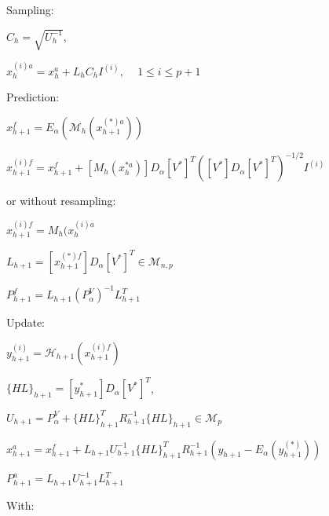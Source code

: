 \documentclass{tufte-book}
\begin{document}
\begin{DoxyEnumerate}
\item \-Sampling\-:
\begin{DoxyItemize}
\item $ C_{h} = \sqrt{U_h^{-1}} $,\par

\item $ x_{h}^{(i)a} = x_h^a + L_hC_hI^{(i)} \textrm{, } \quad 1\leq i \leq p+1 $\par

\end{DoxyItemize}
\item \-Prediction\-:

\begin{DoxyItemize}
\item $ x_{h+1}^f = E_\alpha(\mathcal{M}_{h}(x_{h+1}^{(*)a})) $\par

\item $ x_{h+1}^{(i)f} = x_{h+1}^f + [M_{h}(x_{h}^{*a})]D_\alpha [V^*]^T ([V^*] D_\alpha [V^*]^T)^{-1/2}I^{(i)} $\par

or without resampling:

\item $  x_{h+1}^{(i)f} = M_{h}(x_{h}^{(i)a} $\par



\item $ L_{h+1} = [x_{h+1}^{(*)f}]D_\alpha [V^*]^T \in \mathcal{M}_{n,p} $\par

\item $ P_{h+1}^f = L_{h+1} (P_{\alpha}^V)^{-1} L_{h+1}^T $


\end{DoxyItemize}
\item \-Update\-:
\begin{DoxyItemize}

\item $ y_{h+1}^{(i)} = \mathcal{H}_{h+1}(x_{h+1}^{(i)f})$\par

\item $ \{HL\}_{h+1} = [y_{h+1}^{*}]D_\alpha [V^*]^T$,\par

\item $ U_{h+1} = P_{\alpha}^V + \{HL\}_{h+1}^T R_{h+1}^{-1} \{HL\}_{h+1} \in \mathcal{M}_{p}$\par

\item $ x_{h+1}^a = x_{h+1}^f + L_{h+1}U_{h+1}^{-1}\{HL\}_{h+1}^T R_{h+1}^{-1} (y_{h+1}-E_\alpha(y_{h+1}^{(*)}))$\par

\item $ P_{h+1}^a = L_{h+1} U_{h+1}^{-1} L_{h+1}^T$
\end{DoxyItemize}
\end{DoxyEnumerate}\-With\-: \par
\end{document}
